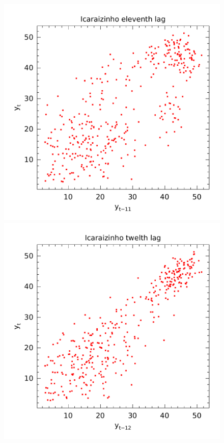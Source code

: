 \begin{figure}
\begin{minipage}[t]{0.45\linewidth}
\begin{minipage}[b]{\linewidth}
    \end{minipage}
  \end{minipage}
  \begin{minipage}[t]{0.45\linewidth}
    \centering
    \begin{minipage}[t]{\linewidth}
      \centering     \includegraphics[width=\textwidth]{Figuras/Icaraizinho/icaraizinho-11-lag.pdf}
    \end{minipage}
    \begin{minipage}[b]{\linewidth}
      \centering     \includegraphics[width=\textwidth]{Figuras/Icaraizinho/icaraizinho-12-lag.pdf}

\end{minipage}
\end{minipage}
\end{figure}

